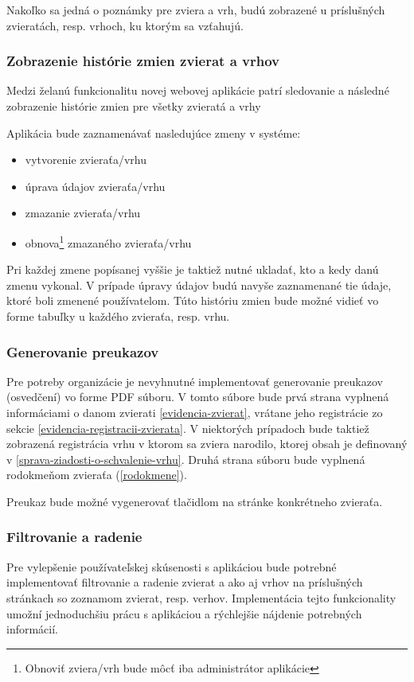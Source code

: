 Nakoľko sa jedná o poznámky pre zviera a vrh, budú zobrazené u príslušných zvieratách, resp. vrhoch, ku ktorým sa vzťahujú.

\subsubsection{Zobrazenie histórie zmien zvierat a vrhov}
Medzi želanú funkcionalitu novej webovej aplikácie patrí sledovanie a následné zobrazenie histórie zmien pre všetky zvieratá a vrhy

Aplikácia bude zaznamenávať nasledujúce zmeny v systéme:
\begin{itemize}
	\item vytvorenie zvieraťa/vrhu
	\item úprava údajov zvieraťa/vrhu
	\item zmazanie zvieraťa/vrhu
	\item obnova\footnote{Obnoviť zviera/vrh bude môcť iba administrátor aplikácie} zmazaného zvieraťa/vrhu
\end{itemize}

Pri každej zmene popísanej vyššie je taktiež nutné ukladať, kto a kedy danú zmenu vykonal. V prípade úpravy údajov budú navyše zaznamenané tie údaje, ktoré boli zmenené používatelom. Túto históriu zmien bude možné vidieť vo forme tabuľky u každého zvieraťa, resp. vrhu.

\subsubsection{Generovanie preukazov}\label{generovanie-preukazov}
Pre potreby organizácie je nevyhnutné implementovať generovanie preukazov (osvedčení) vo forme PDF súboru. V tomto súbore bude prvá strana vyplnená informáciami o danom zvierati \ref{evidencia-zvierat}, vrátane jeho registrácie zo sekcie \ref{evidencia-registracii-zvierata}. V niektorých prípadoch bude taktiež zobrazená registrácia vrhu v ktorom sa zviera narodilo, ktorej obsah je definovaný v \ref{sprava-ziadosti-o-schvalenie-vrhu}. Druhá strana súboru bude vyplnená rodokmeňom zvieraťa (\ref{rodokmene}).

Preukaz bude možné vygenerovať tlačidlom na stránke konkrétneho zvieraťa.

\subsubsection{Filtrovanie a radenie}\label{filtrovanie-a-radenie}
Pre vylepšenie používateľskej skúsenosti s aplikáciou bude potrebné implementovať filtrovanie a radenie zvierat a ako aj vrhov na príslušných stránkach so zoznamom zvierat, resp. verhov. Implementácia tejto funkcionality umožní jednoduchšiu prácu s aplikáciou a rýchlejšie nájdenie potrebných informácií.

